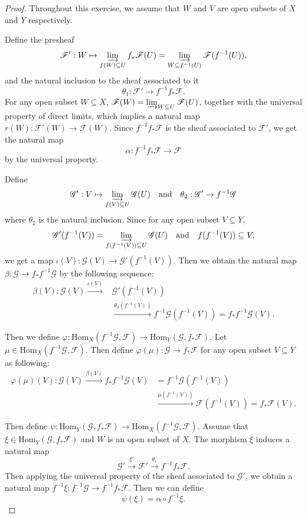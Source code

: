 \documentclass[12pt]{amsart}
\begin{document}
\begin{proof}
   Throughout this exercise, we assume that $W$ and $V$ are open subsets of $X$ and $Y$ respectively.
	
   Define the presheaf$$\mathscr{F}':W\mapsto \varinjlim_{f(W) \subseteq U}{f_*\mathscr{F}(U)}=\varinjlim_{W \subseteq f^{-1}(U)}\mathscr{F}(f^{-1}(U)),$$and the natural inclusion to the sheaf associated to it$$\theta_1:\mathscr{F}'\to f^{-1}f_*\mathscr{F}.$$ For any open subset $W\subseteq X$, $\mathscr{F}(W)=\varinjlim_{W \subseteq U}\mathscr{F}(U)$, together with the universal property of direct limits, which implies a natural map $r(W):\mathscr{F}'(W)\to\mathscr{F}(W)$. Since $f^{-1}f_*\mathscr{F}$ is the sheaf associated to $\mathscr{F}'$, we get the natural map $$\alpha:f^{-1}f_*\mathscr{F}\to\mathscr{F}$$ by the universal property.
   
   Define $$\mathscr{G}':V\mapsto \varinjlim_{f(V) \subseteq U}{\mathscr{G}(U)}\quad \text{and}\quad\theta_2:\mathscr{G}'\to f^{-1}\mathscr{G}$$where $\theta_2$ is the natural inclusion. Since for any open subset $V\subseteq Y$, $$\mathscr{G}'(f^{-1}(V))=\varinjlim_{f(f^{-1}(V)) \subseteq U}{\mathscr{G}(U)}\quad \text{and}\quad f(f^{-1}(V)) \subseteq V,$$we get a map $\iota(V):\mathscr{G}(V) \to \mathscr{G}'(f^{-1}(V))$. Then we obtain the natural map $\beta:\mathscr{G}\to f_*f^{-1}\mathscr{G}$ by the following sequence:
   \begin{align*}
   \beta(V):\mathscr{G}(V) \xrightarrow{\iota(V)} &\mathscr{G}'(f^{-1}(V))\\
   &\xrightarrow{\theta_2(f^{-1}(V))} f^{-1}\mathscr{G}(f^{-1}(V))=f_{*}f^{-1}\mathscr{G}(V).
   \end{align*}
   
   Then we define $\varphi:\mathrm{Hom}_X(f^{-1}\mathscr{G},\mathscr{F})\to\mathrm{Hom}_Y(\mathscr{G},f_*\mathscr{F})$. Let $\mu\in\mathrm{Hom}_X(f^{-1}\mathscr{G},\mathscr{F})$. Then define $\varphi(\mu):\mathscr{G}\to f_*\mathscr{F}$ for any open subset $V\subseteq Y$ as following:
   \begin{align*}
   \varphi(\mu)(V):\mathscr{G}(V)\xrightarrow{\beta(V)}f_*f^{-1}\mathscr{G}(V)&=f^{-1}\mathscr{G}(f^{-1}(V))\\
   &\xrightarrow{\mu(f^{-1}(V))}\mathscr{F}(f^{-1}(V))=f_*\mathscr{F}(V).
   \end{align*}
   
   Then define $\psi:\mathrm{Hom}_Y(\mathscr{G},f_*\mathscr{F})\to\mathrm{Hom}_X(f^{-1}\mathscr{G},\mathscr{F})$. Assume that $\xi\in\mathrm{Hom}_Y(\mathscr{G},f_*\mathscr{F})$ and $W$ is an open subset of $X$. The morphism $\xi$ induces a natural map $$\mathscr{G}'\xrightarrow{\xi'}\mathscr{F}'\xrightarrow{\theta_1} f^{-1}f_*\mathscr{F}.$$ Then applying the universal property of the sheaf associated to $\mathscr{G}'$, we obtain a natural map $f^{-1}\xi:f^{-1}\mathscr{G}\to f^{-1}f_*\mathscr{F}$. Then we can define $$\psi(\xi)=\alpha\circ f^{-1}\xi.$$
   

\end{proof}
\end{document}
